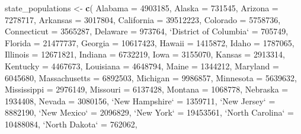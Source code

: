 \documentclass[]{book}
\newenvironment{Shaded}{\begin{snugshade}}{\end{snugshade}}
\newcommand{\DataTypeTok}[1]{\textcolor[rgb]{0.13,0.29,0.53}{#1}}
\newcommand{\DecValTok}[1]{\textcolor[rgb]{0.00,0.00,0.81}{#1}}
\newcommand{\KeywordTok}[1]{\textcolor[rgb]{0.13,0.29,0.53}{\textbf{#1}}}
\newcommand{\NormalTok}[1]{#1}
\newcommand{\StringTok}[1]{\textcolor[rgb]{0.31,0.60,0.02}{#1}}
\begin{document}
\begin{itemize}
\begin{Shaded}
\begin{Highlighting}[]
\NormalTok{state_populations <-}\StringTok{ }\KeywordTok{c}\NormalTok{(}
    \DataTypeTok{Alabama =} \DecValTok{4903185}\NormalTok{, }\DataTypeTok{Alaska =} \DecValTok{731545}\NormalTok{, }\DataTypeTok{Arizona =} \DecValTok{7278717}\NormalTok{, }\DataTypeTok{Arkansas =} \DecValTok{3017804}\NormalTok{,}
    \DataTypeTok{California =} \DecValTok{39512223}\NormalTok{, }\DataTypeTok{Colorado =} \DecValTok{5758736}\NormalTok{, }\DataTypeTok{Connecticut =} \DecValTok{3565287}\NormalTok{,}
    \DataTypeTok{Delaware =} \DecValTok{973764}\NormalTok{, }\StringTok{`}\DataTypeTok{District of Columbia}\StringTok{`}\NormalTok{ =}\StringTok{ }\DecValTok{705749}\NormalTok{, }\DataTypeTok{Florida =} \DecValTok{21477737}\NormalTok{,}
    \DataTypeTok{Georgia =} \DecValTok{10617423}\NormalTok{, }\DataTypeTok{Hawaii =} \DecValTok{1415872}\NormalTok{, }\DataTypeTok{Idaho =} \DecValTok{1787065}\NormalTok{, }\DataTypeTok{Illinois =} \DecValTok{12671821}\NormalTok{,}
    \DataTypeTok{Indiana =} \DecValTok{6732219}\NormalTok{, }\DataTypeTok{Iowa =} \DecValTok{3155070}\NormalTok{, }\DataTypeTok{Kansas =} \DecValTok{2913314}\NormalTok{, }\DataTypeTok{Kentucky =} \DecValTok{4467673}\NormalTok{,}
    \DataTypeTok{Louisiana =} \DecValTok{4648794}\NormalTok{, }\DataTypeTok{Maine =} \DecValTok{1344212}\NormalTok{, }\DataTypeTok{Maryland =} \DecValTok{6045680}\NormalTok{, }\DataTypeTok{Massachusetts =} \DecValTok{6892503}\NormalTok{,}
    \DataTypeTok{Michigan =} \DecValTok{9986857}\NormalTok{, }\DataTypeTok{Minnesota =} \DecValTok{5639632}\NormalTok{, }\DataTypeTok{Mississippi =} \DecValTok{2976149}\NormalTok{,}
    \DataTypeTok{Missouri =} \DecValTok{6137428}\NormalTok{, }\DataTypeTok{Montana =} \DecValTok{1068778}\NormalTok{, }\DataTypeTok{Nebraska =} \DecValTok{1934408}\NormalTok{, }\DataTypeTok{Nevada =} \DecValTok{3080156}\NormalTok{,}
    \StringTok{`}\DataTypeTok{New Hampshire}\StringTok{`}\NormalTok{ =}\StringTok{ }\DecValTok{1359711}\NormalTok{, }\StringTok{`}\DataTypeTok{New Jersey}\StringTok{`}\NormalTok{ =}\StringTok{ }\DecValTok{8882190}\NormalTok{, }\StringTok{`}\DataTypeTok{New Mexico}\StringTok{`}\NormalTok{ =}\StringTok{ }\DecValTok{2096829}\NormalTok{,}
    \StringTok{`}\DataTypeTok{New York}\StringTok{`}\NormalTok{ =}\StringTok{ }\DecValTok{19453561}\NormalTok{, }\StringTok{`}\DataTypeTok{North Carolina}\StringTok{`}\NormalTok{ =}\StringTok{ }\DecValTok{10488084}\NormalTok{, }\StringTok{`}\DataTypeTok{North Dakota}\StringTok{`}\NormalTok{ =}\StringTok{ }\DecValTok{762062}\NormalTok{,}

\end{Highlighting}
\end{Shaded}
\end{itemize}
\end{document}
